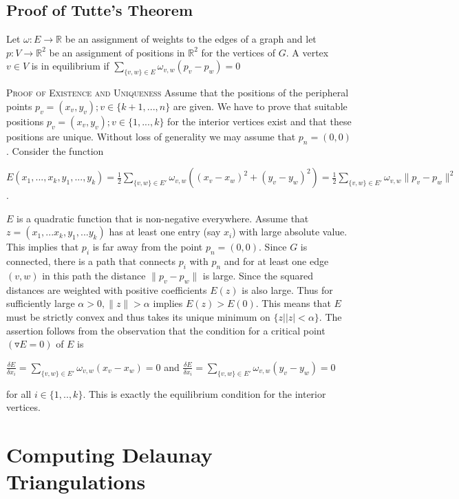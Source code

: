 \documentclass{article}
\newcommand{\R}{\mathbb{R}}
\begin{document}
\subsection{Proof of Tutte's Theorem}
Let $\omega : E \rightarrow \R$ be an assignment of weights to the edges of a graph and let $p:V \rightarrow \R^2$ be an assignment of positions in $\R^2$ for the vertices of $G$. A vertex $v \in V$ is in equilibrium if  $\sum\limits_{\{v,w\} \in E} \omega_{v,w}(p_v - p_w) = 0$

\textsc {Proof of Existence and Uniqueness}  Assume that the positions of the peripheral points $p_v = (x_v,y_v); v \in \{k+1,...,n\}$ are given. We have to prove that suitable positions $p_v = (x_v,y_v); v \in \{1,...,k\}$ for the interior vertices exist and that these positions are unique. Without loss of generality we may assume that $p_n = (0,0)$. Consider the function
\begin{center}
$E(x_1,...,x_k,y_1,...,y_k) = \frac{1}{2} \sum\limits_{\{v,w\} \in E'} \omega_{v,w}((x_v - x_w)^2 + (y_v - y_w)^2) 
= \frac{1}{2} \sum\limits_{\{v,w\} \in E'} \omega_{v,w} \|p_v - p_w\|^2$. \\
\end{center}
$E$ is a quadratic function that is non-negative everywhere. Assume that $z=(x_1,...x_k,y_1,...y_k)$ has at least one entry (say $x_i$) with large absolute value. This implies that $p_i$ is far away from the point $p_n = (0,0)$. Since $G$ is connected, there is a path that connects $p_i$ with $p_n$ and for at least one edge $(v,w)$ in this path the distance $\|p_v - p_w\|$ is large. Since the squared distances are weighted with positive coefficients $E(z)$ is also large. Thus for sufficiently large $\alpha > 0, \|z\| > \alpha$ implies $E(z) > E(0)$. This means that $E$ must be strictly convex and thus takes its unique minimum on $\{z | |z| < \alpha \}$. The assertion follows from the observation that the condition for a critical point $(\triangledown E = 0)$ of $E$ is
\begin{center}
$\frac{\delta E}{\delta x_i} = \sum\limits_{\{v,w\} \in E'} \omega_{v,w}(x_v - x_w) = 0$ and $\frac{\delta E}{\delta x_i} = \sum\limits_{\{v,w\} \in E'} \omega_{v,w}(y_v - y_w) = 0$
\end{center}
for all $i \in \{1,..,k\}$. This is exactly the equilibrium condition for the interior vertices.

\section{Computing Delaunay Triangulations}
\end{document}
